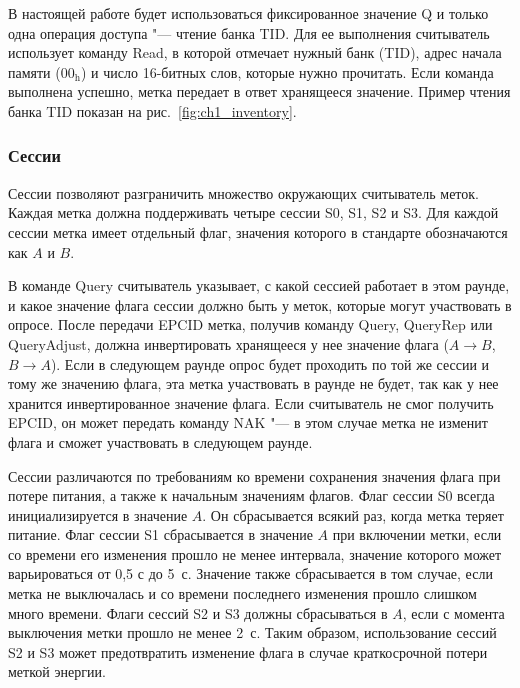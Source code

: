 В настоящей работе будет использоваться фиксированное значение Q и только одна операция доступа "--- чтение банка TID. Для ее выполнения считыватель использует команду Read, в которой отмечает нужный банк (TID), адрес начала памяти ($\text{00}_\text{h}$) и число 16-битных слов, которые нужно прочитать. Если команда выполнена успешно, метка передает в ответ хранящееся значение. Пример чтения банка TID показан на рис.~\ref{fig:ch1_inventory}.



\subsubsection{Сессии}\label{sec:ch1_rfid_std_sessions}

Сессии позволяют разграничить множество окружающих считыватель меток. Каждая метка должна поддерживать четыре сессии S0, S1, S2 и S3. Для каждой сессии метка имеет отдельный флаг, значения которого в стандарте обозначаются как $A$ и $B$.

В команде Query считыватель указывает, с какой сессией работает в этом раунде, и какое значение флага сессии должно быть у меток, которые могут участвовать в опросе. После передачи EPCID метка, получив команду Query, QueryRep или QueryAdjust, должна инвертировать хранящееся у нее значение флага ($A \rightarrow B$, $B \rightarrow A$). Если в следующем раунде опрос будет проходить по той же сессии и тому же значению флага, эта метка участвовать в раунде не будет, так как у нее хранится инвертированное значение флага. Если считыватель не смог получить EPCID, он может передать команду NAK "--- в этом случае метка не изменит флага и сможет участвовать в следующем раунде.

Сессии различаются по требованиям ко времени сохранения значения флага при потере питания, а также к начальным значениям флагов. Флаг сессии S0 всегда инициализируется в значение $A$. Он сбрасывается всякий раз, когда метка теряет питание. Флаг сессии S1 сбрасывается в значение $A$ при включении метки, если со времени его изменения прошло не менее интервала, значение которого может варьироваться от 0,5 с до 5~с. Значение также сбрасывается в том случае, если метка не выключалась и со времени последнего изменения прошло слишком много времени. Флаги сессий S2 и S3 должны сбрасываться в $A$, если с момента выключения метки прошло не менее 2~с. Таким образом, использование сессий S2 и S3 может предотвратить изменение флага в случае краткосрочной потери меткой энергии.


